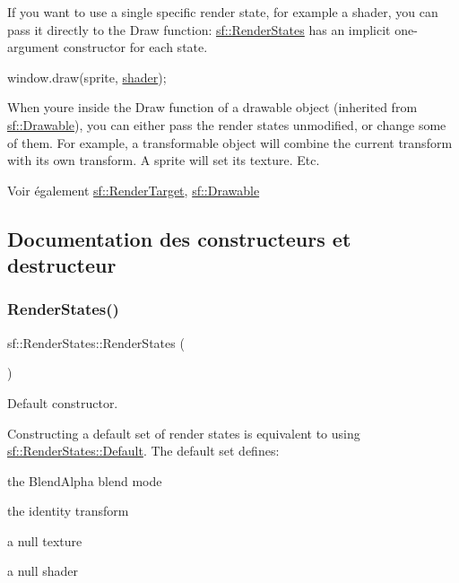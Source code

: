 If you want to use a single specific render state, for example a shader, you can pass it directly to the Draw function\+: \hyperlink{classsf_1_1RenderStates}{sf\+::\+Render\+States} has an implicit one-\/argument constructor for each state. 
\begin{DoxyCode}
window.draw(sprite, \hyperlink{classsf_1_1RenderStates_ad4f79ecdd0c60ed0d24fbe555b221bd8}{shader});
\end{DoxyCode}


When you\textquotesingle{}re inside the Draw function of a drawable object (inherited from \hyperlink{classsf_1_1Drawable}{sf\+::\+Drawable}), you can either pass the render states unmodified, or change some of them. For example, a transformable object will combine the current transform with its own transform. A sprite will set its texture. Etc.

\begin{DoxySeeAlso}{Voir également}
\hyperlink{classsf_1_1RenderTarget}{sf\+::\+Render\+Target}, \hyperlink{classsf_1_1Drawable}{sf\+::\+Drawable} 
\end{DoxySeeAlso}


\subsection{Documentation des constructeurs et destructeur}
\mbox{\label{classsf_1_1RenderStates_a885bf14070d0d5391f062f62b270b7d0}} 
\subsubsection{\texorpdfstring{Render\+States()}{RenderStates()}\hspace{0.1cm}{\footnotesize\ttfamily [1/6]}}
{\footnotesize\ttfamily sf\+::\+Render\+States\+::\+Render\+States (\begin{DoxyParamCaption}{ }\end{DoxyParamCaption})}



Default constructor. 

Constructing a default set of render states is equivalent to using \hyperlink{classsf_1_1RenderStates_ad29672df29f19ce50c3021d95f2bb062}{sf\+::\+Render\+States\+::\+Default}. The default set defines\+: \begin{DoxyItemize}
\item the Blend\+Alpha blend mode \item the identity transform \item a null texture \item a null shader \end{DoxyItemize}
\mbox{\label{classsf_1_1RenderStates_acac8830a593c8a4523ac2fdf3cac8a01}} 
